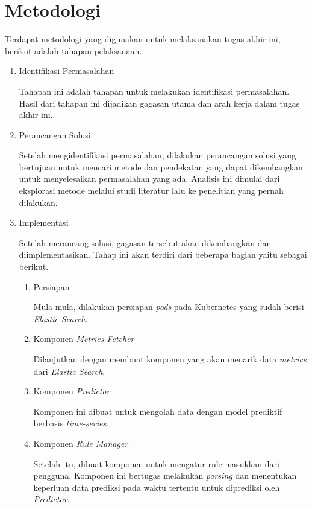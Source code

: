 \section{Metodologi}

Terdapat metodologi yang digunakan untuk melaksanakan tugas akhir ini, berikut adalah tahapan pelaksanaan.
\begin{enumerate}
    \item Identifikasi Permasalahan
    
    Tahapan ini adalah tahapan untuk melakukan identifikasi permasalahan. Hasil dari tahapan ini dijadikan gagasan utama dan arah kerja dalam tugas akhir ini.

    \item Perancangan Solusi
    
    Setelah mengidentifikasi permasalahan, dilakukan perancangan solusi yang bertujuan untuk mencari metode dan pendekatan yang dapat dikembangkan untuk menyelesaikan permasalahan yang ada. Analisis ini dimulai dari eksplorasi metode melalui studi literatur lalu ke penelitian yang pernah dilakukan.

    \item Implementasi
    
    Setelah merancang solusi, gagasan tersebut akan dikembangkan dan diimplementasikan. Tahap ini akan terdiri dari beberapa bagian yaitu sebagai berikut.
    \begin{enumerate}
        \item Persiapan
    
        Mula-mula, dilakukan persiapan \textit{pods} pada Kubernetes yang sudah berisi \textit{Elastic Search}.


        \item Komponen \textit{Metrics Fetcher}
        
        Dilanjutkan dengan membuat komponen yang akan menarik data \textit{metrics} dari \textit{Elastic Search}.

        \item Komponen \textit{Predictor}
        
        Komponen ini dibuat untuk mengolah data dengan model prediktif berbasis \textit{time-series}.

        \item Komponen \textit{Rule Manager}
        
        Setelah itu, dibuat komponen untuk mengatur rule masukkan dari pengguna. Komponen ini bertugas melakukan \textit{parsing} dan menentukan keperluan data prediksi pada waktu tertentu untuk diprediksi oleh \textit{Predictor}.


\end{enumerate}
\end{enumerate}
